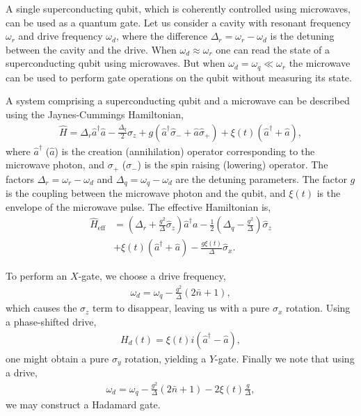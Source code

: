 A single superconducting qubit, which is coherently controlled using microwaves, can be used as a quantum gate. Let us consider a cavity with resonant frequency $\omega_{r}$ and drive frequency $\omega_{d}$, where the difference \mbox{$\Delta_{r} = \omega_{r} - \omega_{d}$} is the detuning between the cavity and the drive. When \mbox{$\omega_{d} \approx \omega_{r}$} one can read the state of a superconducting qubit using microwaves. But when \mbox{$\omega_{d} = \omega_{q} \ll \omega_{r}$} the microwave can be used to perform gate operations on the qubit without measuring its state.

A system comprising a superconducting qubit and a microwave can be described using the Jaynes-Cummings Hamiltonian,
\begin{align}
\hat{H} = \Delta _{r} \hat{a}^{\dag} \hat{a} - \frac{\Delta_{q}}{2} \hat\sigma_{z} + g (\hat{a}^{\dag} \hat\sigma_{-} + \hat{a} \hat\sigma_{+}) + \xi(t) (\hat{a}^{\dag} + \hat{a}),
\label{eq:driven_jc_hamiltonian}
\end{align}
where $\hat{a}^{\dag}$ ($\hat{a}$) is the creation (annihilation) operator corresponding to the microwave photon, and $\sigma_{+}$ ($\sigma_{-}$) is the spin raising (lowering) operator. The factors \mbox{$\Delta_{r} = \omega_{r} - \omega_{d}$} and \mbox{$\Delta_{q} = \omega_{q} - \omega_{d}$} are the detuning parameters. The factor $g$ is the coupling between the microwave photon and the qubit, and $\xi(t)$ is the envelope of the microwave pulse. The effective Hamiltonian is,
\begin{align}
\hat{H}_\mathrm{eff} &= \left( \Delta_{r} + \frac{g^{2}}{\Delta} \hat\sigma_{z} \right) \hat{a}^{\dag} a - \frac{1}{2} \left(\Delta_{q} - \frac{g^{2}}{\Delta} \right) \hat\sigma_{z} \nonumber\\
&+ \xi(t) (\hat{a}^{\dag} + \hat{a}) - \frac{g \xi(t)}{\Delta} \hat\sigma_{x}.
\end{align}

To perform an $X$-gate, we choose a drive frequency,
\begin{align}
\omega_{d} = \omega_{q} - \frac{g^{2}}{\Delta}(2 \bar{n} + 1),
\end{align}
which causes the $\sigma_{z}$ term to disappear, leaving us with a pure $\sigma_{x}$ rotation. Using a phase-shifted drive,
\begin{align}
H_{d}(t) = \xi(t) i (\hat{a}^{\dag} - \hat{a}),
\end{align}
one might obtain a pure $\sigma_{y}$ rotation, yielding a $Y$-gate. Finally we note that using a drive,
\begin{align}
	\omega_{d} = \omega_{q} - \frac{g^{2}}{\Delta}(2 \bar{n} + 1) - 2 \xi(t)\frac{g}{\Delta},
\end{align}
we may construct a Hadamard gate. 

